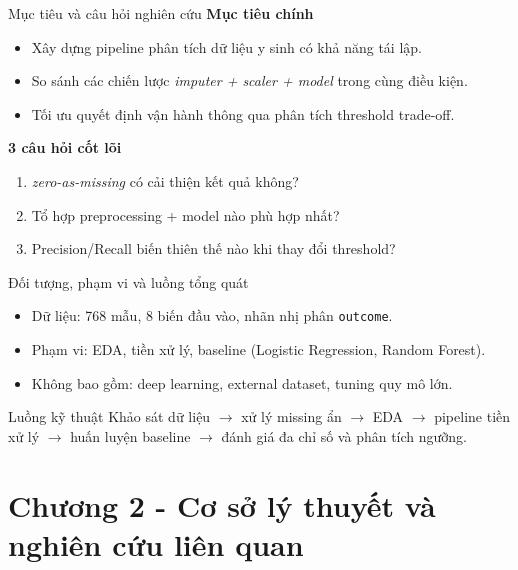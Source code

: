 \documentclass[10pt]{beamer}
\begin{document}
\begin{frame}{Mục tiêu và câu hỏi nghiên cứu}
  \textbf{Mục tiêu chính}
  \begin{itemize}
    \item Xây dựng pipeline phân tích dữ liệu y sinh có khả năng tái lập.
    \item So sánh các chiến lược \textit{imputer + scaler + model} trong cùng điều kiện.
    \item Tối ưu quyết định vận hành thông qua phân tích threshold trade-off.
  \end{itemize}
  \vspace{0.4em}
  \textbf{3 câu hỏi cốt lõi}
  \begin{enumerate}
    \item \textit{zero-as-missing} có cải thiện kết quả không?
    \item Tổ hợp preprocessing + model nào phù hợp nhất?
    \item Precision/Recall biến thiên thế nào khi thay đổi threshold?
  \end{enumerate}
\end{frame}

\begin{frame}{Đối tượng, phạm vi và luồng tổng quát}
  \begin{itemize}
    \item Dữ liệu: 768 mẫu, 8 biến đầu vào, nhãn nhị phân \texttt{outcome}.
    \item Phạm vi: EDA, tiền xử lý, baseline (Logistic Regression, Random Forest).
    \item Không bao gồm: deep learning, external dataset, tuning quy mô lớn.
  \end{itemize}
  \begin{block}{Luồng kỹ thuật}
    Khảo sát dữ liệu $\rightarrow$ xử lý missing ẩn $\rightarrow$ EDA $\rightarrow$ pipeline tiền xử lý
    $\rightarrow$ huấn luyện baseline $\rightarrow$ đánh giá đa chỉ số và phân tích ngưỡng.
  \end{block}
\end{frame}

\section{Chương 2 - Cơ sở lý thuyết và nghiên cứu liên quan}
\end{document}
